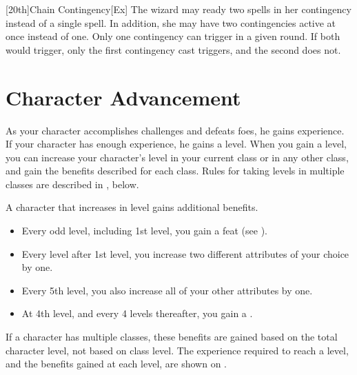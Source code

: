 [20th]{Chain Contingency}[Ex]
The wizard may ready two spells in her contingency instead of a single spell.
In addition, she may have two contingencies active at once instead of one.
Only one contingency can trigger in a given round.
If both would trigger, only the first contingency cast triggers, and the second does not.

\section{Character Advancement}\label{Character Advancement}

As your character accomplishes challenges and defeats foes, he gains experience.
If your character has enough experience, he gains a level.
When you gain a level, you can increase your character's level in your current class or in any other class, and gain the benefits described for each class.
Rules for taking levels in multiple classes are described in , below.

A character that increases in level gains additional benefits.
\begin{itemize}
    \item Every odd level, including 1st level, you gain a feat (see ).
    \item Every level after 1st level, you increase two different attributes of your choice by one.
    \item Every 5th level, you also increase all of your other attributes by one.
    \item At 4th level, and every 4 levels thereafter, you gain a .
\end{itemize}

If a character has multiple classes, these benefits are gained based on the total character level, not based on class level.
The experience required to reach a level, and the benefits gained at each level, are shown on .

